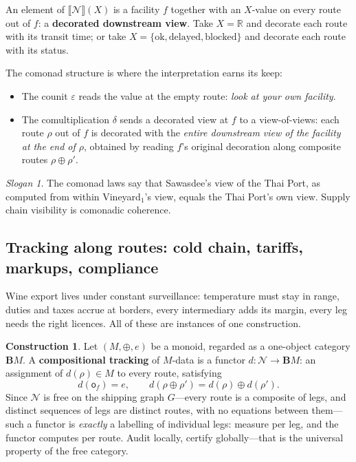 \documentclass[11pt,a4paper]{article}
\newcommand{\Ext}[1]{\llbracket #1 \rrbracket}
\newcommand{\N}{\mathcal{N}}
\newcommand{\obs}{\mathsf{o}}
\theoremstyle{plain}
\theoremstyle{definition}
\newtheorem{construction}[theorem]{Construction}
\theoremstyle{remark}
\newtheorem{slogan}[theorem]{Slogan}
\begin{document}
An element of $\Ext{\N}(X)$ is a facility $f$ together with an
$X$-value on every route out of $f$: a \textbf{decorated downstream
view}. Take $X = \mathbb{R}$ and decorate each route with its transit
time; or take $X = \{\text{ok}, \text{delayed}, \text{blocked}\}$ and
decorate each route with its status.

The comonad structure is where the interpretation earns its keep:
\begin{itemize}[nosep]
\item The counit $\varepsilon$ reads the value at the empty route:
  \emph{look at your own facility}.
\item The comultiplication $\delta$ sends a decorated view at $f$ to a
  view-of-views: each route $\rho$ out of $f$ is decorated with the
  \emph{entire downstream view of the facility at the end of $\rho$},
  obtained by reading $f$'s original decoration along composite routes
  $\rho \oplus \rho'$.
\end{itemize}

\begin{slogan}\label{slo:coherence}
The comonad laws say that Sawasdee's view of the Thai Port, as
computed from within Vineyard$_1$'s view, equals the Thai Port's own
view. Supply chain visibility is comonadic coherence.
\end{slogan}

\subsection{Tracking along routes: cold chain, tariffs, markups, compliance}
\label{sec:tracking}

Wine export lives under constant surveillance: temperature must stay
in range, duties and taxes accrue at borders, every intermediary adds
its margin, every leg needs the right licences. All of these are
instances of one construction.

\begin{construction}\label{con:tracking}
Let $(M, \oplus, e)$ be a monoid, regarded as a one-object
category $\mathbf{B}M$. A \textbf{compositional tracking} of $M$-data
is a functor $d : \N \to \mathbf{B}M$: an assignment of $d(\rho) \in M$
to every route, satisfying
\[
d(\obs_f) = e, \qquad d(\rho \oplus \rho') = d(\rho) \oplus d(\rho').
\]
Since $\N$ is free on the shipping graph $G$---every route is a
composite of legs, and distinct sequences of legs are distinct
routes, with no equations between them---such a functor is
\emph{exactly} a labelling of individual legs: measure per leg, and
the functor computes per route. Audit locally, certify globally---that
is the universal property of the free category.
\end{construction}
\end{document}
